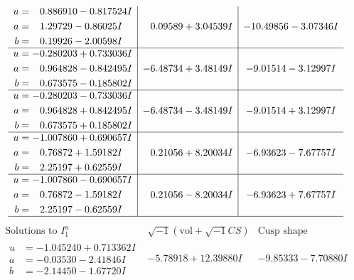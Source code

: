 \documentclass[1p]{elsarticle_modified}
\theoremstyle{definition}
\newcommand{\I}{\sqrt{-1}}
\begin{document}
$$\begin{array}{c|c|c}
\begin{aligned}
u &= \phantom{-}0.886910 - 0.817524 I \\
a &= \phantom{-}1.29729 - 0.86025 I \\
b &= \phantom{-}0.19926 - 2.00598 I\end{aligned}
 & \phantom{-}0.09589 + 3.04539 I & -10.49856 - 3.07346 I \\ \hline\begin{aligned}
u &= -0.280203 + 0.733036 I \\
a &= \phantom{-}0.964828 - 0.842495 I \\
b &= \phantom{-}0.673575 - 0.185802 I\end{aligned}
 & -6.48734 + 3.48149 I & -9.01514 - 3.12997 I \\ \hline\begin{aligned}
u &= -0.280203 - 0.733036 I \\
a &= \phantom{-}0.964828 + 0.842495 I \\
b &= \phantom{-}0.673575 + 0.185802 I\end{aligned}
 & -6.48734 - 3.48149 I & -9.01514 + 3.12997 I \\ \hline\begin{aligned}
u &= -1.007860 + 0.690657 I \\
a &= \phantom{-}0.76872 + 1.59182 I \\
b &= \phantom{-}2.25197 + 0.62559 I\end{aligned}
 & \phantom{-}0.21056 + 8.20034 I & -6.93623 - 7.67757 I \\ \hline\begin{aligned}
u &= -1.007860 - 0.690657 I \\
a &= \phantom{-}0.76872 - 1.59182 I \\
b &= \phantom{-}2.25197 - 0.62559 I\end{aligned}
 & \phantom{-}0.21056 - 8.20034 I & -6.93623 + 7.67757 I\\
 \hline 
 \end{array}$$\newpage$$\begin{array}{c|c|c}  
\text{Solutions to }I^u_{1}& \I (\text{vol} + \sqrt{-1}CS) & \text{Cusp shape}\\
 \hline 
\begin{aligned}
u &= -1.045240 + 0.713362 I \\
a &= -0.03530 - 2.41846 I \\
b &= -2.14450 - 1.67720 I\end{aligned}
 & -5.78918 + 12.39880 I & -9.85333 - 7.70880 I \\ \hline\begin{aligned}

\end{aligned}
\end{array}$$
\end{document}
